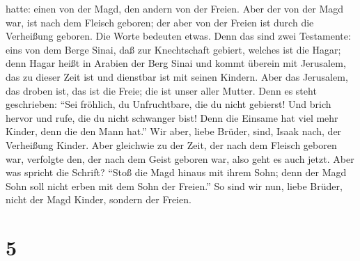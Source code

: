 hatte: einen von der Magd, den andern von der Freien.  Aber
der von der Magd war, ist nach dem Fleisch geboren; der aber von der
Freien ist durch die Verheißung geboren.  Die Worte
bedeuten etwas. Denn das sind zwei Testamente: eins von dem Berge Sinai,
daß zur Knechtschaft gebiert, welches ist die Hagar;  denn
Hagar heißt in Arabien der Berg Sinai und kommt überein mit Jerusalem,
das zu dieser Zeit ist und dienstbar ist mit seinen Kindern.
 Aber das Jerusalem, das droben ist, das ist die Freie; die
ist unser aller Mutter.  Denn es steht geschrieben: ``Sei
fröhlich, du Unfruchtbare, die du nicht gebierst! Und brich hervor und
rufe, die du nicht schwanger bist! Denn die Einsame hat viel mehr
Kinder, denn die den Mann hat.''  Wir aber, liebe Brüder,
sind, Isaak nach, der Verheißung Kinder.  Aber gleichwie zu
der Zeit, der nach dem Fleisch geboren war, verfolgte den, der nach dem
Geist geboren war, also geht es auch jetzt.  Aber was
spricht die Schrift? ``Stoß die Magd hinaus mit ihrem Sohn; denn der
Magd Sohn soll nicht erben mit dem Sohn der Freien.''  So
sind wir nun, liebe Brüder, nicht der Magd Kinder, sondern der Freien.

\hypertarget{section-4}{%
\section{5}\label{section-4}}


